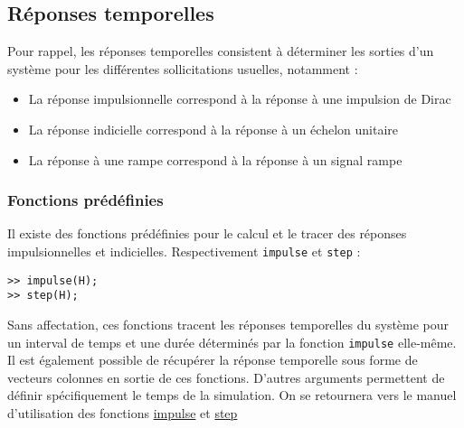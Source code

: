 \subsection{Réponses temporelles}
Pour rappel, les réponses temporelles consistent à déterminer les sorties 
d'un système pour les différentes sollicitations usuelles, notamment :
\begin{itemize}
    \item La réponse impulsionnelle correspond à la réponse à une impulsion de Dirac
    \item La réponse indicielle correspond à la réponse à un échelon unitaire
    \item La réponse à une rampe correspond à la réponse à un signal rampe
\end{itemize}
\subsubsection{Fonctions prédéfinies}
Il existe des fonctions prédéfinies pour le calcul et le tracer des 
réponses impulsionnelles et indicielles. Respectivement \texttt{impulse} et \texttt{step} :
\begin{verbatim}
>> impulse(H);
>> step(H);
\end{verbatim}
Sans affectation, ces fonctions tracent les réponses temporelles du système pour 
un interval de temps et une durée déterminés par la fonction \texttt{impulse} 
elle-même.
Il est également possible de récupérer la réponse temporelle sous forme 
de vecteurs colonnes en sortie de ces fonctions. D'autres arguments permettent 
de définir spécifiquement le temps de la simulation.
On se retournera vers le manuel d'utilisation des 
fonctions \href{https://fr.mathworks.com/help/control/ref/dynamicsystem.impulse.html}{impulse} 
et \href{https://fr.mathworks.com/help/control/ref/dynamicsystem.step.html}{step}~\cite{impulse,step}
